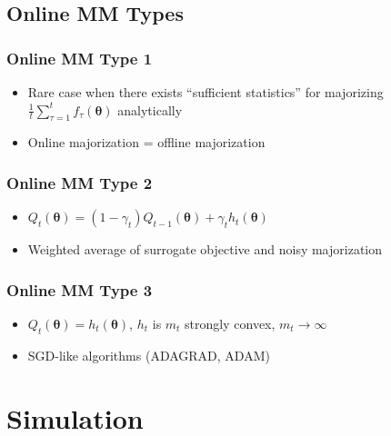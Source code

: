 \documentclass{beamer}
\begin{document}
\subsection{Online MM Types}
\begin{frame}
  \frametitle{Online MM Type 1}
  \begin{itemize}
    \item Rare case when there exists ``sufficient statistics'' for majorizing $\frac{1}{t}\sum_{\tau=1}^t f_\tau(\bm\theta)$ analytically
    \item Online majorization = offline majorization
  \end{itemize}
\end{frame}
\begin{frame}
  \frametitle{Online MM Type 2}
  \begin{itemize}
    \item $Q_t(\bm\theta) = (1 - \gamma_t)Q_{t-1}(\bm\theta) + \gamma_t h_t(\bm\theta)$
    \item Weighted average of surrogate objective and noisy majorization
  \end{itemize}
\end{frame}
\begin{frame}
  \frametitle{Online MM Type 3}
  \begin{itemize}
    \item $Q_t(\bm\theta) = h_t(\bm\theta)$, $h_t$ is $m_t$ strongly convex, $m_t\rightarrow\infty$
    \item SGD-like algorithms (ADAGRAD, ADAM)
  \end{itemize}
\end{frame}


\section{Simulation}
\end{document}
